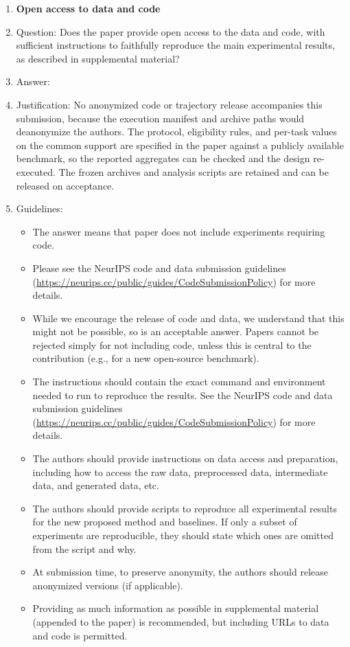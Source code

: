 \begin{enumerate}
\item {\bf Open access to data and code}
    \item[] Question: Does the paper provide open access to the data and code, with sufficient instructions to faithfully reproduce the main experimental results, as described in supplemental material?
    \item[] Answer: \answerNo{}
    \item[] Justification: No anonymized code or trajectory release accompanies this submission, because the execution manifest and archive paths would deanonymize the authors. The protocol, eligibility rules, and per-task values on the common support are specified in the paper against a publicly available benchmark, so the reported aggregates can be checked and the design re-executed. The frozen archives and analysis scripts are retained and can be released on acceptance.
    \item[] Guidelines:
    \begin{itemize}
        \item The answer \answerNA{} means that paper does not include experiments requiring code.
        \item Please see the NeurIPS code and data submission guidelines (\url{https://neurips.cc/public/guides/CodeSubmissionPolicy}) for more details.
        \item While we encourage the release of code and data, we understand that this might not be possible, so \answerNo{} is an acceptable answer. Papers cannot be rejected simply for not including code, unless this is central to the contribution (e.g., for a new open-source benchmark).
        \item The instructions should contain the exact command and environment needed to run to reproduce the results. See the NeurIPS code and data submission guidelines (\url{https://neurips.cc/public/guides/CodeSubmissionPolicy}) for more details.
        \item The authors should provide instructions on data access and preparation, including how to access the raw data, preprocessed data, intermediate data, and generated data, etc.
        \item The authors should provide scripts to reproduce all experimental results for the new proposed method and baselines. If only a subset of experiments are reproducible, they should state which ones are omitted from the script and why.
        \item At submission time, to preserve anonymity, the authors should release anonymized versions (if applicable).
        \item Providing as much information as possible in supplemental material (appended to the paper) is recommended, but including URLs to data and code is permitted.
    \end{itemize}



\end{enumerate}
